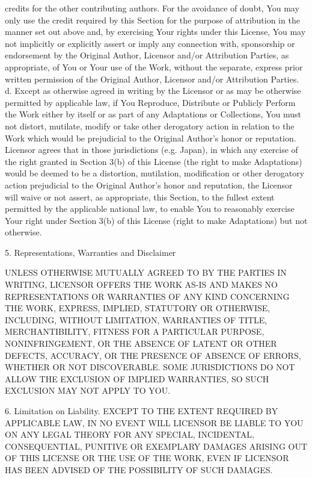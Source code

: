     credits for the other contributing authors. For the avoidance of
    doubt, You may only use the credit required by this Section for the
    purpose of attribution in the manner set out above and, by exercising
    Your rights under this License, You may not implicitly or explicitly
    assert or imply any connection with, sponsorship or endorsement by the
    Original Author, Licensor and/or Attribution Parties, as appropriate,
    of You or Your use of the Work, without the separate, express prior
    written permission of the Original Author, Licensor and/or Attribution
    Parties.
 d. Except as otherwise agreed in writing by the Licensor or as may be
    otherwise permitted by applicable law, if You Reproduce, Distribute or
    Publicly Perform the Work either by itself or as part of any
    Adaptations or Collections, You must not distort, mutilate, modify or
    take other derogatory action in relation to the Work which would be
    prejudicial to the Original Author's honor or reputation. Licensor
    agrees that in those jurisdictions (e.g. Japan), in which any exercise
    of the right granted in Section 3(b) of this License (the right to
    make Adaptations) would be deemed to be a distortion, mutilation,
    modification or other derogatory action prejudicial to the Original
    Author's honor and reputation, the Licensor will waive or not assert,
    as appropriate, this Section, to the fullest extent permitted by the
    applicable national law, to enable You to reasonably exercise Your
    right under Section 3(b) of this License (right to make Adaptations)
    but not otherwise.

5. Representations, Warranties and Disclaimer

UNLESS OTHERWISE MUTUALLY AGREED TO BY THE PARTIES IN WRITING, LICENSOR
OFFERS THE WORK AS-IS AND MAKES NO REPRESENTATIONS OR WARRANTIES OF ANY
KIND CONCERNING THE WORK, EXPRESS, IMPLIED, STATUTORY OR OTHERWISE,
INCLUDING, WITHOUT LIMITATION, WARRANTIES OF TITLE, MERCHANTIBILITY,
FITNESS FOR A PARTICULAR PURPOSE, NONINFRINGEMENT, OR THE ABSENCE OF
LATENT OR OTHER DEFECTS, ACCURACY, OR THE PRESENCE OF ABSENCE OF ERRORS,
WHETHER OR NOT DISCOVERABLE. SOME JURISDICTIONS DO NOT ALLOW THE EXCLUSION
OF IMPLIED WARRANTIES, SO SUCH EXCLUSION MAY NOT APPLY TO YOU.

6. Limitation on Liability. EXCEPT TO THE EXTENT REQUIRED BY APPLICABLE
LAW, IN NO EVENT WILL LICENSOR BE LIABLE TO YOU ON ANY LEGAL THEORY FOR
ANY SPECIAL, INCIDENTAL, CONSEQUENTIAL, PUNITIVE OR EXEMPLARY DAMAGES
ARISING OUT OF THIS LICENSE OR THE USE OF THE WORK, EVEN IF LICENSOR HAS
BEEN ADVISED OF THE POSSIBILITY OF SUCH DAMAGES.


